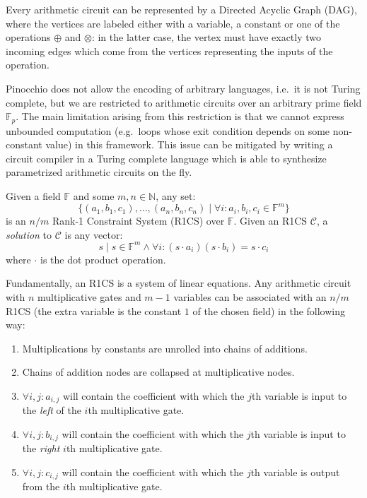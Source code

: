 \noindent Every arithmetic circuit can be represented by a Directed Acyclic Graph (DAG), where the
vertices are labeled either with a variable, a constant or one of the operations \(\oplus \) and
\(\otimes \): in the latter case, the vertex must have exactly two incoming edges which come from
the vertices representing the inputs of the operation.

Pinocchio does not allow the encoding of arbitrary languages, i.e.\ it is not Turing complete, but
we are restricted to arithmetic circuits over an arbitrary prime field \(\mathbb{F}_p\).
The main limitation arising from this restriction is that we cannot express unbounded computation
(e.g.\ loops whose exit condition depends on some non-constant value) in this framework.
This issue can be mitigated by writing a circuit compiler in a Turing complete language which
is able to synthesize parametrized arithmetic circuits on the fly.

\begin{definition}
	Given a field \(\mathbb{F}\) and some \(m, n \in \mathbb{N}\), any set:
	\[ \{(a_1, b_1, c_1), \dots, (a_n, b_n, c_n) \mid \forall i\colon a_i, b_i, c_i \in
		\mathbb{F}^m\} \]
	is an \(n/m\) Rank-1 Constraint System (R1CS) over \(\mathbb{F}\).
	Given an R1CS \(\mathcal{C}\), a \emph{solution} to \(\mathcal{C}\) is any vector:
	\[ s \mid s \in \mathbb{F}^m \wedge \forall i\colon (s \cdot a_i)(s \cdot b_i) = s \cdot c_i \]
	where \(\cdot \) is the dot product operation.
\end{definition}

\noindent Fundamentally, an R1CS is a system of linear equations.
Any arithmetic circuit with \(n\) multiplicative gates and \(m-1\) variables can be associated with
an \(n/m\) R1CS (the extra variable is the constant \(1\) of the chosen field) in the following way:
\begin{enumerate}
	\item Multiplications by constants are unrolled into chains of additions.
	\item Chains of addition nodes are collapsed at multiplicative nodes.
	\item \(\forall i,j\colon a_{i,j}\) will contain the coefficient with which the \(j\)th variable
	      is input to the \emph{left} of the \(i\)th multiplicative gate.
	\item \(\forall i,j\colon b_{i,j}\) will contain the coefficient with which the \(j\)th variable
	      is input to the \emph{right} \(i\)th multiplicative gate.
	\item \(\forall i,j\colon c_{i,j}\) will contain the coefficient with which the \(j\)th variable
	      is output from the \(i\)th multiplicative gate.
\end{enumerate}

